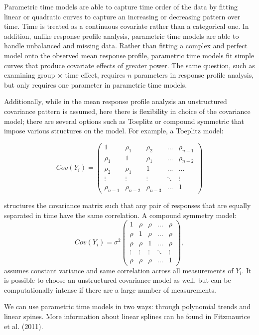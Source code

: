 \documentclass[12pt, twoside]{amherstthesis}
\begin{document}
Parametric time models are able to capture time order of the data by fitting linear or quadratic curves to capture an increasing or decreasing pattern over time. Time is treated as a continuous covariate rather than a categorical one. In addition, unlike response profile analysis, parametric time models are able to handle unbalanced and missing data. Rather than fitting a complex and perfect model onto the observed mean response profile, parametric time models fit simple curves that produce covariate effects of greater power. The same question, such as examining group \(\times\) time effect, requires \(n\) parameters in response profile analysis, but only requires one parameter in parametric time models.

Additionally, while in the mean response profile analysis an unstructured covariance pattern is assumed, here there is flexibility in choice of the covariance model; there are several options such as Toeplitz or compound symmetric that impose various structures on the model. For example, a Toeplitz model:

\[Cov (Y_i) = \begin{pmatrix} 1 & \rho_1 & \rho_2 & ... & \rho_{n-1} \\ \rho_1 & 1 & \rho_1 & ... & \rho_{n-2} \\ \rho_2 & \rho_1 & 1 & ...& ... \\ \vdots & \vdots & \vdots & \ddots & \vdots \\ \rho_{n-1} & \rho_{n-2} & \rho_{n-3} & ... & 1  \end{pmatrix}\]

structures the covariance matrix such that any pair of responses that are equally separated in time have the same correlation. A compound symmetry model: \[Cov (Y_i) = \sigma^2\begin{pmatrix} 1 & \rho & \rho & ... & \rho \\ \rho & 1 & \rho & ... & \rho \\ \rho & \rho & 1 & ...& \rho \\ \vdots & \vdots & \vdots & \ddots& \vdots \\ \rho & \rho & \rho & ... & 1   \end{pmatrix}, \] assumes constant variance and same correlation across all measurements of \(Y_i.\) It is possible to choose an unstructured covariance model as well, but can be computationally intense if there are a large number of measurements.

We can use parametric time models in two ways: through polynomial trends and linear spines. More information about linear splines can be found in Fitzmaurice et al. (2011).
\end{document}
